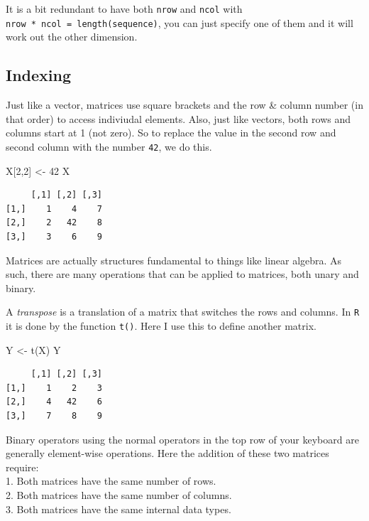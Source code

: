 \documentclass[
  letterpaper,
]{book}
\newenvironment{Shaded}{\begin{snugshade}}{\end{snugshade}}
\newcommand{\DecValTok}[1]{\textcolor[rgb]{0.68,0.00,0.00}{#1}}
\newcommand{\FunctionTok}[1]{\textcolor[rgb]{0.28,0.35,0.67}{#1}}
\newcommand{\NormalTok}[1]{\textcolor[rgb]{0.00,0.23,0.31}{#1}}
\newcommand{\OtherTok}[1]{\textcolor[rgb]{0.00,0.23,0.31}{#1}}
\begin{document}
It is a bit redundant to have both \texttt{nrow} and \texttt{ncol} with
\texttt{nrow\ *\ ncol\ =\ length(sequence)}, you can just specify one of
them and it will work out the other dimension.

\subsection{Indexing}\label{indexing}

Just like a vector, matrices use square brackets and the row \& column
number (in that order) to access indiviudal elements. Also, just like
vectors, both rows and columns start at 1 (not zero). So to replace the
value in the second row and second column with the number \texttt{42},
we do this.

\begin{Shaded}
\begin{Highlighting}[]
\NormalTok{X[}\DecValTok{2}\NormalTok{,}\DecValTok{2}\NormalTok{] }\OtherTok{\textless{}{-}} \DecValTok{42}
\NormalTok{X}
\end{Highlighting}
\end{Shaded}

\begin{verbatim}
     [,1] [,2] [,3]
[1,]    1    4    7
[2,]    2   42    8
[3,]    3    6    9
\end{verbatim}

Matrices are actually structures fundamental to things like linear
algebra. As such, there are many operations that can be applied to
matrices, both unary and binary.

A \emph{transpose} is a translation of a matrix that switches the rows
and columns. In \texttt{R} it is done by the function \texttt{t()}. Here
I use this to define another matrix.

\begin{Shaded}
\begin{Highlighting}[]
\NormalTok{Y }\OtherTok{\textless{}{-}} \FunctionTok{t}\NormalTok{(X)}
\NormalTok{Y}
\end{Highlighting}
\end{Shaded}

\begin{verbatim}
     [,1] [,2] [,3]
[1,]    1    2    3
[2,]    4   42    6
[3,]    7    8    9
\end{verbatim}

Binary operators using the normal operators in the top row of your
keyboard are generally element-wise operations. Here the addition of
these two matrices require:\\
1. Both matrices have the same number of rows.\\
2. Both matrices have the same number of columns.\\
3. Both matrices have the same internal data types.
\end{document}
